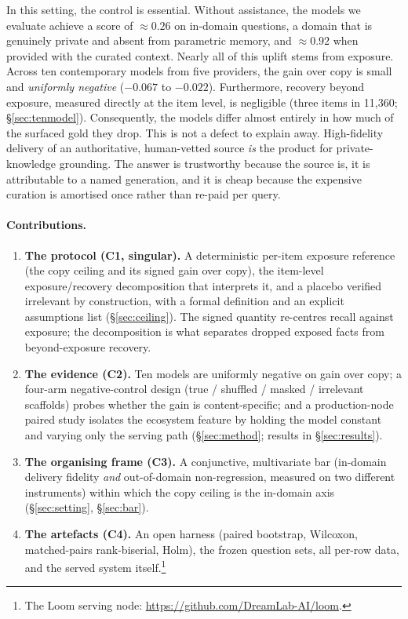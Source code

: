 \documentclass[10pt,twocolumn]{article}
\begin{document}
In this setting, the control is essential. Without assistance, the models we evaluate achieve a score of $\approx0.26$ on in-domain questions, a domain that is genuinely private and absent from parametric memory, and $\approx0.92$ when provided with the curated context. Nearly all of this uplift stems from exposure. Across ten contemporary models from five providers, the gain over copy is small and \emph{uniformly negative} ($-0.067$ to $-0.022$). Furthermore, recovery beyond exposure, measured directly at the item level, is negligible (three items in 11{,}360; \S\ref{sec:tenmodel}). Consequently, the models differ almost entirely in how much of the surfaced gold they drop. This is not a defect to explain away. High-fidelity delivery of an authoritative, human-vetted source \emph{is} the product for private-knowledge grounding. The answer is trustworthy because the source is, it is attributable to a named generation, and it is cheap because the expensive curation is amortised once rather than re-paid per query.

\paragraph{Contributions.}
\begin{enumerate}[topsep=2pt,itemsep=1pt]
\item \textbf{The protocol (C1, singular).} A deterministic per-item exposure reference (the copy
ceiling and its signed gain over copy), the item-level exposure/recovery decomposition that interprets
it, and a placebo verified irrelevant by construction, with a formal definition and an explicit
assumptions list (\S\ref{sec:ceiling}). The signed quantity re-centres recall against exposure; the
decomposition is what separates dropped exposed facts from beyond-exposure recovery.
\item \textbf{The evidence (C2).} Ten models are uniformly negative on gain over copy; a four-arm
negative-control design (true / shuffled / masked / irrelevant scaffolds) probes whether the gain is
content-specific; and a production-node paired study isolates the ecosystem feature by
holding the model constant and varying only the serving path (\S\ref{sec:method}; results in
\S\ref{sec:results}).
\item \textbf{The organising frame (C3).} A conjunctive, multivariate bar (in-domain delivery
fidelity \emph{and} out-of-domain non-regression, measured on two different instruments) within
which the copy ceiling is the in-domain axis (\S\ref{sec:setting}, \S\ref{sec:bar}).
\item \textbf{The artefacts (C4).} An open harness (paired bootstrap, Wilcoxon, matched-pairs
rank-biserial, Holm), the frozen question sets, all per-row data, and the served system
itself.\footnote{The Loom serving node: \url{https://github.com/DreamLab-AI/loom}.}
\end{enumerate}
\end{document}
